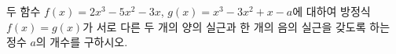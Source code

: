 두 함수 $f(x)=2x^3-5x^2-3x$, $g(x)=x^3-3x^2+x-a$에 대하여 방정식 $f(x)=g(x)$가 서로 다른 두 개의 양의 실근과 한 개의 음의 실근을 갖도록 하는 정수 $a$의 개수를 구하시오.
